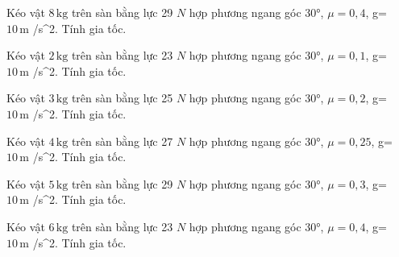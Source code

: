 \begin{ex}
Kéo vật $8\,\text{kg}$ trên sàn bằng lực 29 $N$ hợp phương ngang góc 30°, $\mu=0,4$, g= $10\,\text{m}$ /s^2. Tính gia tốc.
\end{ex}

\begin{ex}
Kéo vật $2\,\text{kg}$ trên sàn bằng lực 23 $N$ hợp phương ngang góc 30°, $\mu=0,1$, g= $10\,\text{m}$ /s^2. Tính gia tốc.
\end{ex}

\begin{ex}
Kéo vật $3\,\text{kg}$ trên sàn bằng lực 25 $N$ hợp phương ngang góc 30°, $\mu=0,2$, g= $10\,\text{m}$ /s^2. Tính gia tốc.
\end{ex}

\begin{ex}
Kéo vật $4\,\text{kg}$ trên sàn bằng lực 27 $N$ hợp phương ngang góc 30°, $\mu=0,25$, g= $10\,\text{m}$ /s^2. Tính gia tốc.
\end{ex}

\begin{ex}
Kéo vật $5\,\text{kg}$ trên sàn bằng lực 29 $N$ hợp phương ngang góc 30°, $\mu=0,3$, g= $10\,\text{m}$ /s^2. Tính gia tốc.
\end{ex}

\begin{bt}
Kéo vật $6\,\text{kg}$ trên sàn bằng lực 23 $N$ hợp phương ngang góc 30°, $\mu=0,4$, g= $10\,\text{m}$ /s^2. Tính gia tốc.
\end{bt}

